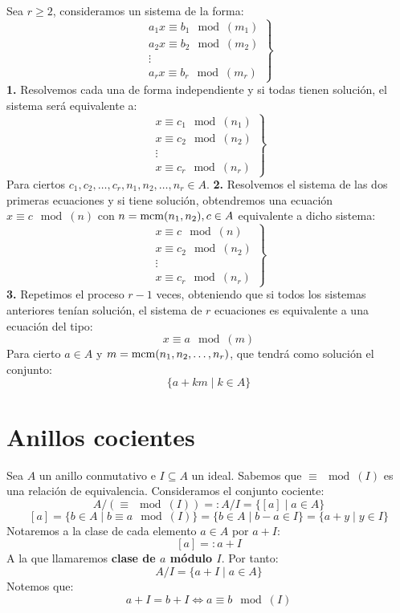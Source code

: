 Sea $r\geq 2$, consideramos un sistema de la forma:
$$\left. \begin{array}{c}
        a_1x\equiv b_1\mod(m_1) \\
        a_2x\equiv b_2\mod(m_2) \\
        \vdots                  \\
        a_rx\equiv b_r\mod(m_r)
    \end{array} \right\}$$
\textbf{1.} Resolvemos cada una de forma independiente y si todas tienen solución, el sistema será equivalente a:
$$\left. \begin{array}{c}
        x \equiv c_1\mod(n_1) \\
        x\equiv c_2\mod(n_2)  \\
        \vdots                \\
        x\equiv c_r\mod(n_r)
    \end{array} \right\}$$
Para ciertos $c_1, c_2, \ldots, c_r, n_1, n_2, \ldots, n_r \in A$.\newline
\textbf{2.} Resolvemos el sistema de las dos primeras ecuaciones y si tiene solución, obtendremos una ecuación
$x\equiv c\mod(n)$ con $n=\operatorname{mcm}(n_1,n_2),c\in A$ equivalente a dicho sistema:
$$\left. \begin{array}{c}
        x \equiv c\mod(n)    \\
        x\equiv c_2\mod(n_2) \\
        \vdots               \\
        x\equiv c_r\mod(n_r)
    \end{array} \right\}$$
\textbf{3.} Repetimos el proceso $r-1$ veces, obteniendo que si todos los sistemas anteriores tenían solución, el
sistema de $r$ ecuaciones es equivalente a una ecuación del tipo:
$$x\equiv a\mod(m)$$
Para cierto $a \in A$ y $m=\operatorname{mcm}(n_1, n_2, \ldots, n_r)$, que tendrá como solución el conjunto:
$$\{a+km \mid k \in A\}$$

\newpage
\section{Anillos cocientes}
\noindent
Sea $A$ un anillo conmutativo e $I \subseteq A$ un ideal.\newline
Sabemos que $\equiv\mod(I)$ es una relación de equivalencia. Consideramos el conjunto cociente:
$$A/(\equiv\mod(I)) =: A/I = \{[a] \mid a \in A\}$$
$$[a] = \{b \in A \mid b\equiv a\mod(I)\} = \{b \in A \mid b-a \in I\} = \{a+y \mid y \in I\}$$
Notaremos a la clase de cada elemento $a \in A$ por $a+I$:
$$[a]=:a+I$$
A la que llamaremos \textbf{clase de $a$ módulo $I$}. Por tanto:
$$A/I = \{a+I \mid a \in A\}$$
Notemos que:
$$a+I = b+I \Longleftrightarrow a\equiv b\mod(I)$$

